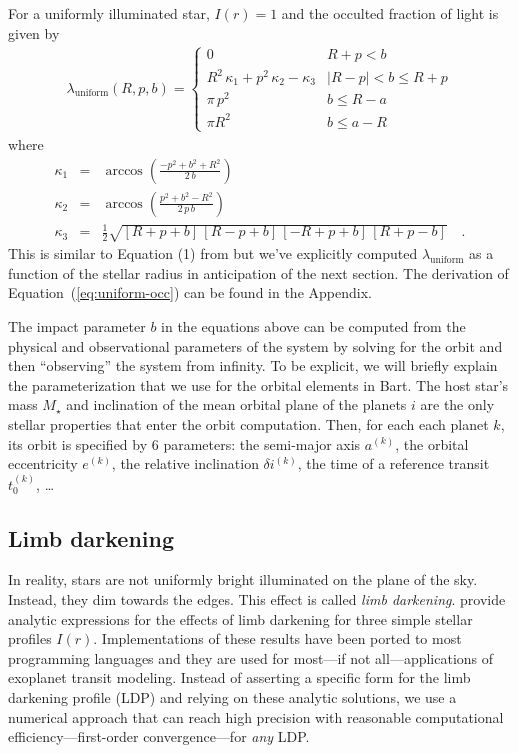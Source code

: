 \documentclass[12pt,preprint]{aastex}
\newcommand{\project}[1]{{\sffamily #1}}
\newcommand{\bart}{\project{Bart}}
\newcommand{\Eq}[1]{Equation~(\ref{eq:#1})}
\newcommand{\eq}[1]{\Eq{#1}}
\newcommand{\eqlabel}[1]{\label{eq:#1}}
\begin{document}
For a uniformly illuminated star, $I(r) = 1$ and the occulted fraction of
light is given by
\begin{eqnarray}\eqlabel{uniform-occ}
    \lambda_\mathrm{uniform} (R, p, b) = \left \{ \begin{array}{ll}
            0 & R + p < b \\
            R^2 \, \kappa_1 + p^2 \, \kappa_2 - \kappa_3
                & |R - p| < b \leq R + p \\
            \pi \, p^2 & b \leq R - a \\
            \pi R^2 & b \leq a - R
        \end{array} \right.
\end{eqnarray}
where
\begin{eqnarray}
    \kappa_1 & = & \arccos \left ( \frac{-p^2 + b^2 + R^2}{2 \, b} \right ) \\
    \kappa_2 & = & \arccos \left ( \frac{p^2 + b^2 - R^2}{2\, p \, b}
                           \right ) \\
    \kappa_3 & = & \frac{1}{2} \sqrt{[R + p + b] \, [R - p + b]
                        \, [-R + p + b] \, [R + p - b]} \quad.
\end{eqnarray}
This is similar to Equation (1) from \citet{mandel} but we've explicitly
computed $\lambda_\mathrm{uniform}$ as a function of the stellar radius in
anticipation of the next section. The derivation of \eq{uniform-occ} can be
found in the Appendix.

The impact parameter $b$ in the equations above can be computed from the
physical and observational parameters of the system by solving for the orbit
and then ``observing'' the system from infinity. To be explicit, we will
briefly explain the parameterization that we use for the orbital elements in
\bart. The host star's mass $M_\star$ and inclination of the mean orbital
plane of the planets $i$ are the only stellar properties that enter
the orbit computation. Then, for each each planet $k$, its orbit is
specified by 6 parameters: the semi-major axis $a^{(k)}$, the orbital
eccentricity $e^{(k)}$, the relative inclination $\delta i^{(k)}$, the time of
a reference transit $t_0^{(k)}$, \ldots


\subsection{Limb darkening}

In reality, stars are not uniformly bright illuminated on the plane of the
sky. Instead, they dim towards the edges. This effect is called
\emph{limb darkening}. \citet{mandel} provide analytic expressions for the
effects of limb darkening for three simple stellar profiles $I(r)$.
Implementations of these results have been ported to most programming
languages and they are used for most---if not all---applications of exoplanet
transit modeling. Instead of asserting a specific form for the limb darkening
profile (LDP) and relying on these analytic solutions, we use a numerical
approach that can reach high precision with reasonable computational
efficiency---first-order convergence---for \emph{any} LDP.
\end{document}
